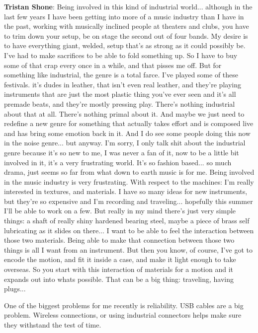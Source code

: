 \textbf{Tristan Shone}: Being involved in this kind of industrial world... although in the last few years I have been getting into more of a music industry than I have in the past, working with musically inclined people at theaters and clubs, you have to trim down your setup, be on stage the second out of four bands. My desire is to have everything giant, welded, setup that's as strong as it could possibly be. I've had to make sacrifices to be able to fold something up. So I have to buy some of that crap every once in a while, and that pisses me off. But for something like industrial, the genre is a total farce. I've played some of these festivals. it's dudes in leather, that isn't even real leather, and they're playing instruments that are just the most plastic thing you've ever seen and it's all premade beats, and they're mostly pressing play. There's nothing industrial about that at all. There's nothing primal about it. And maybe we just need to redefine a new genre for something that actually takes effort and is composed live and has bring some emotion back in it. And I do see some people doing this now in the noise genre... but anyway. I'm sorry, I only talk shit about the industrial genre because it's so new to me, I was never a fan of it, now to be a little bit involved in it, it's  a very frustrating world. It's so fashion based... so much drama, just seems so far from what down to earth music is for me. Being involved in the music industry is very frustrating. With respect to the machines: I'm really interested in textures, and materials. I have so many ideas for new instruments, but they're so expensive and I'm recording and traveling... hopefully this summer I'll be able to work on a few. But really in my mind there's just very simple things: a shaft of really shiny hardened bearing steel, maybe a piece of brass self lubricating as it slides on there... I want to be able to feel the interaction between those two materials. Being able to make that connection between those two things is all I want from an instrument. But then you know, of course, I've got to encode the motion, and fit it inside a case, and make it light enough to take overseas. So you start with this interaction of materials for a motion and it expands out into whats possible. That can be a big thing: traveling, having plugs... 

One of the biggest problems for me recently is reliability. USB cables are a big problem. Wireless connections, or using industrial connectors helps make sure they withstand the test of time. 


